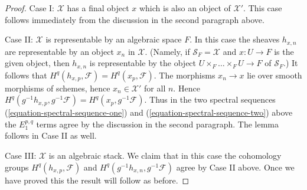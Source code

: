 \documentclass{stacks-project}
\theoremstyle{plain}
\theoremstyle{definition}
\theoremstyle{remark}
\numberwithin{equation}{subsection}
\begin{document}
\begin{proof}
\medskip\noindent
Case I: $\mathcal{X}$ has a final object $x$ which is also an object of
$\mathcal{X}'$. This case follows immediately from the discussion
in the second paragraph above.

\medskip\noindent
Case II: $\mathcal{X}$ is representable by an algebraic space $F$.
In this case the sheaves $h_{x, n}$ are representable by an
object $x_n$ in $\mathcal{X}$. (Namely, if $\mathcal{S}_F = \mathcal{X}$
and $x : U \to F$ is the given object, then $h_{x, n}$ is representable
by the object $U \times_F \ldots \times_F U \to F$ of $\mathcal{S}_F$.)
It follows that $H^q(h_{x, p}, \mathcal{F}) = H^q(x_p, \mathcal{F})$.
The morphisms $x_n \to x$ lie over smooth morphisms of schemes, hence
$x_n \in \mathcal{X}'$ for all $n$. Hence
$H^q(g^{-1}h_{x, p}, g^{-1}\mathcal{F}) = H^q(x_p, g^{-1}\mathcal{F})$.
Thus in the two spectral sequences
(\ref{equation-spectral-sequence-one}) and
(\ref{equation-spectral-sequence-two}) above the $E_1^{p, q}$ terms agree
by the discussion in the second paragraph. The lemma follows in Case II
as well.

\medskip\noindent
Case III: $\mathcal{X}$ is an algebraic stack. We claim that in this case
the cohomology groups $H^q(h_{x, p}, \mathcal{F})$ and
$H^q(g^{-1}h_{x, n}, g^{-1}\mathcal{F})$ agree by Case II above.
Once we have proved this the result will follow as before.


\end{proof}
\end{document}
